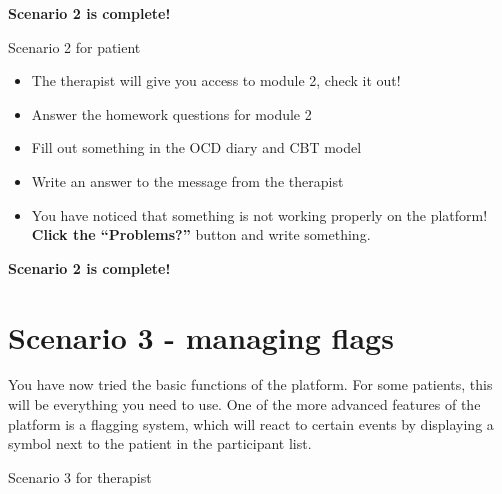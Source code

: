 \documentclass[]{book}
\providecommand{\tightlist}{%
  \setlength{\itemsep}{0pt}\setlength{\parskip}{0pt}}
\begin{document}
\textbf{Scenario 2 is complete!}

Scenario 2 for patient

\begin{itemize}
\tightlist
\item
  The therapist will give you access to module 2, check it out!
\item
  Answer the homework questions for module 2
\item
  Fill out something in the OCD diary and CBT model
\item
  Write an answer to the message from the therapist
\item
  You have noticed that something is not working properly on the platform! \textbf{Click the ``Problems?''} button and write something.
\end{itemize}

\textbf{Scenario 2 is complete!}

\hypertarget{scenario-3---managing-flags}{%
\section{Scenario 3 - managing flags}\label{scenario-3---managing-flags}}

You have now tried the basic functions of the platform. For some patients, this will be everything you need to use. One of the more advanced features of the platform is a flagging system, which will react to certain events by displaying a symbol next to the patient in the participant list.

Scenario 3 for therapist
\end{document}
